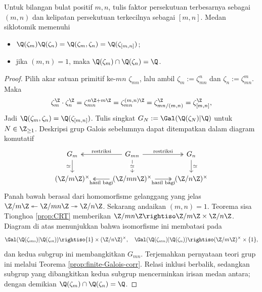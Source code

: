 \begin{proposition}
	Untuk bilangan bulat positif $m,n$, tulis faktor persekutuan terbesarnya sebagai $(m,n)$ dan kelipatan persekutuan terkecilnya sebagai $[m,n]$. Medan siklotomik memenuhi
	\begin{itemize}
		\item $\Q(\zeta_m) \Q(\zeta_n) = \Q(\zeta_m, \zeta_n) = \Q(\zeta_{[m,n]})$;
		\item jika $(m,n)=1$, maka $\Q(\zeta_m)\cap\Q(\zeta_n)=\Q$.
	\end{itemize}
\end{proposition}
\begin{proof}
	Pilih akar satuan primitif ke-$mn$ $\zeta_{mn}$, lalu ambil $\zeta_m:=\zeta_{mn}^n$ dan $\zeta_n:=\zeta_{mn}^m$. Maka
	\[ \zeta_m^\Z \cdot \zeta_n^\Z = \zeta_{mn}^{n\Z + m\Z} = \zeta_{mn}^{(m,n)\Z} = \zeta_{mn/(m,n)}^\Z = \zeta_{[m,n]}^\Z , \]
	Jadi $\Q(\zeta_m,\zeta_n)=\Q(\zeta_{[m,n]})$. Tulis singkat $G_N:=\Gal(\Q(\zeta_N)|\Q)$ untuk $N\in\Z_{\geq1}$. Deskripsi grup Galois sebelumnya dapat ditempatkan dalam diagram komutatif
	\[\begin{tikzcd}
		G_m \arrow[d, "\simeq"'] & G_{mn} \arrow[twoheadrightarrow, l, "\text{restriksi}"'] \arrow[twoheadrightarrow, r, "\text{restriksi}"] \arrow[d, "\simeq" description] & G_n \arrow[d, "\simeq"] \\
		(\Z/m\Z)^\times & (\Z/mn\Z)^\times \arrow[twoheadrightarrow, l, "\text{hasil bagi}"] \arrow[twoheadrightarrow, r, "\text{hasil bagi}"'] & (\Z/n\Z)^\times
	\end{tikzcd}\]
	Panah bawah berasal dari homomorfisme gelanggang yang jelas $\Z/m\Z\twoheadleftarrow\Z/mn\Z\twoheadrightarrow\Z/n\Z$. Sekarang andaikan $(m,n)=1$. Teorema sisa Tionghoa \ref{prop:CRT} memberikan $\Z/mn\Z\rightiso\Z/m\Z\times\Z/n\Z$. Diagram di atas menunjukkan bahwa isomorfisme ini membatasi pada
	\[ \Gal(\Q(\zeta_{mn})|\Q(\zeta_m)) \rightiso  \{1\} \times (\Z/n\Z)^\times, \quad \Gal(\Q(\zeta_{mn})|\Q(\zeta_n)) \rightiso (\Z/m\Z)^\times \times \{1\}, \]
	dan kedua subgrup ini membangkitkan $G_{mn}$. Terjemahkan pernyataan teori grup ini melalui Teorema \ref{prop:finite-Galois-corr}. Relasi inklusi berbalik, sedangkan subgrup yang dibangkitkan kedua subgrup mencerminkan irisan medan antara; dengan demikian $\Q(\zeta_m)\cap\Q(\zeta_n)=\Q$.
\end{proof}

